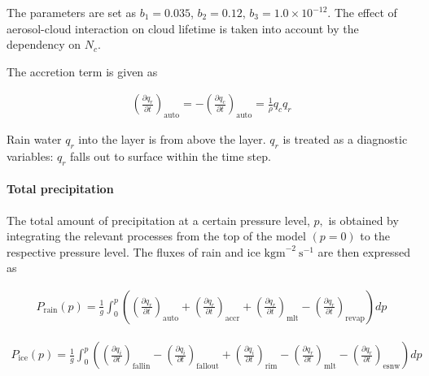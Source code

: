 The parameters are set as \(b_1 = 0.035\), \(b_2 =0.12\),
\(b_3 = 1.0\times10^{-12}\). The effect of aerosol-cloud interaction on
cloud lifetime is taken into account by the dependency on \(N_c\).

The accretion term is given as

\begin{eqnarray}
\left(\frac{\partial q_r}{\partial t}\right)_{\text {auto}}
=-\left(\frac{\partial q_c}{\partial t}\right)_{\text {auto}}
=\frac{1}{\rho}q_c q_r
\end{eqnarray}

Rain water \(q_r\) into the layer is from above the layer. \(q_r\) is
treated as a diagnostic variables: \(q_r\) falls out to surface within
the time step.

\hypertarget{total-precipitation}{%
\paragraph{Total precipitation}\label{total-precipitation}}

The total amount of precipitation at a certain pressure level, \(p,\) is
obtained by integrating the relevant processes from the top of the model
\((p=0)\) to the respective pressure level. The fluxes of rain and ice
\(\mathrm{kgm}^{-2} \mathrm{~s}^{-1}\) are then expressed as

\begin{eqnarray}
P_{\text {rain}}(p) =\frac{1}{g} \int_{0}^{p}\left(
\left(\frac{\partial q_r}{\partial t}\right)_{\text {auto}}
+\left(\frac{\partial q_r}{\partial t}\right)_{\text {accr}}
+\left(\frac{\partial q_r}{\partial t}\right)_{\text {mlt}}
-\left(\frac{\partial q_r}{\partial t}\right)_{\text {revap}}
\right) d p
\end{eqnarray}

\begin{eqnarray}
P_{\text {ice}}(p)
=\frac{1}{g} \int_{0}^{p}\left(
\left(\frac{\partial q_i}{\partial t}\right)_{\text {fallin}}
-\left(\frac{\partial q_i}{\partial t}\right)_{\text {fallout}}
+\left(\frac{\partial q_i}{\partial t}\right)_{\text {rim}}
-\left(\frac{\partial q_r}{\partial t}\right)_{\text {mlt}}
-\left(\frac{\partial q_r}{\partial t}\right)_{\text {esnw}}
\right) d p
\end{eqnarray}

